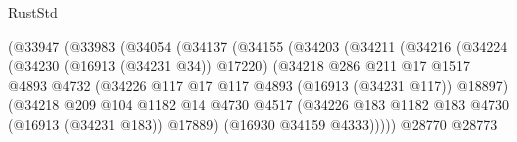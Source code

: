 \begin{lexlean}{RustStd}
\begin{coremodule}
                                      (@33947
                                        (@33983
                                          (@34054
                                            (@34137
                                              (@34155
                                                (@34203
                                                  (@34211
                                                    (@34216
                                                      (@34224
                                                        (@34230 (@16913 (@34231 @34)) @17220)
                                                        (@34218
                                                          @286
                                                          @211
                                                          @17
                                                          @1517
                                                          @4893
                                                          @4732
                                                          (@34226
                                                            @117
                                                            @17
                                                            @117
                                                            @4893
                                                            (@16913 (@34231 @117))
                                                            @18897)
                                                          (@34218
                                                            @209
                                                            @104
                                                            @1182
                                                            @14
                                                            @4730
                                                            @4517
                                                            (@34226
                                                              @183
                                                              @1182
                                                              @183
                                                              @4730
                                                              (@16913 (@34231 @183))
                                                              @17889)
                                                            (@16930 @34159 @4333)))))
                                                    @28770
                                                    @28773

\end{coremodule}
\end{lexlean}
